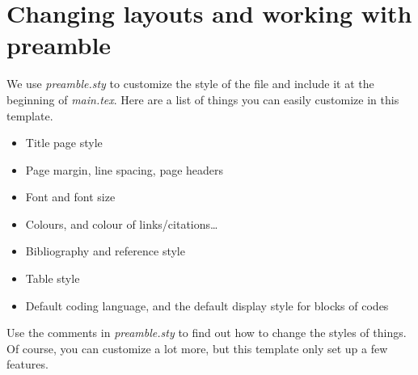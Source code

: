 \section{Changing layouts and working with preamble}\label{sec:intro:layouts}
We use \emph{preamble.sty} to customize the style of the file and include it at the beginning of \emph{main.tex}.
Here are a list of things you can easily customize in this template. 
\begin{itemize}
    \item Title page style
    \item Page margin, line spacing, page headers
    \item Font and font size
    \item Colours, and colour of links/citations\ldots
    \item Bibliography and reference style
    \item Table style
    \item Default coding language, and the default display style for blocks of codes
\end{itemize}
Use the comments in \emph{preamble.sty} to find out how to change the styles of things.
Of course, you can customize a lot more, but this template only set up a few features.
